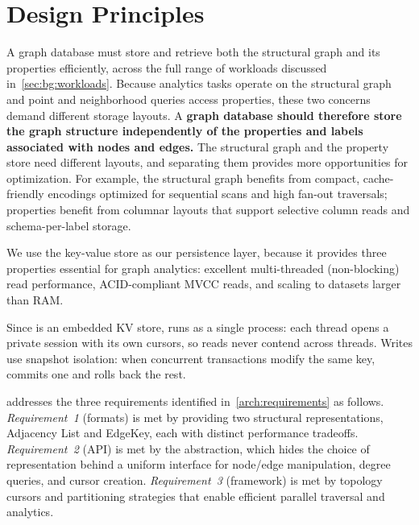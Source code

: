 \section{Design Principles}
\label{arch:design-principles}

A graph database must store and retrieve both the structural graph and its properties efficiently, across the full range of workloads discussed in~\autoref{sec:bg:workloads}.
Because analytics tasks operate on the structural graph and point and neighborhood queries access properties, these two concerns demand different storage layouts.
A \textbf{graph database should therefore store the graph structure independently of the properties and labels associated with nodes and edges.}
The structural graph and the property store need different layouts, and separating them provides more opportunities for optimization.
For example, the structural graph benefits from compact, cache-friendly encodings optimized for sequential scans and high fan-out traversals; properties benefit from columnar layouts that support selective column reads and schema-per-label storage.

We use the \wt{} key-value store as our persistence layer, because it provides three properties essential for graph analytics:
excellent multi-threaded (non-blocking) read performance, \ac{ACID}-compliant \ac{MVCC} reads, and scaling to datasets larger than RAM.

Since \wt{} is an embedded KV store, \project{} runs as a single process: each thread opens a private session with its own cursors, so reads never contend across threads.
Writes use snapshot isolation: when concurrent transactions modify the same key, \wt{} commits one and rolls back the rest.

\project{} addresses the three requirements identified in~\autoref{arch:requirements} as follows.
\emph{Requirement~1} (formats) is met by providing two structural representations, Adjacency List and EdgeKey, each with distinct performance tradeoffs.
\emph{Requirement~2} (API) is met by the  abstraction, which hides the choice of representation behind a uniform interface for node/edge manipulation, degree queries, and cursor creation.
\emph{Requirement~3} (framework) is met by topology cursors and partitioning strategies that enable efficient parallel traversal and analytics.

